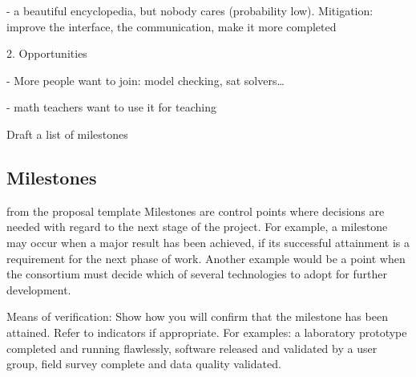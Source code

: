 - a beautiful encyclopedia, but nobody cares (probability low). Mitigation: improve the interface, the communication, make it more completed

2.  Opportunities

- More people want to join: model checking, sat solvers… 

- math teachers want to use it for teaching


{\color{red} Draft a list of milestones}

\subsection{Milestones}\label{sec:milestones}

\begin{todo}{from the proposal template}
  Milestones are control points where decisions are needed with regard to the next stage
  of the project. For example, a milestone may occur when a major result has been
  achieved, if its successful attainment is a requirement for the next phase of
  work. Another example would be a point when the consortium must decide which of several
  technologies to adopt for further development.

  Means of verification: Show how you will confirm that the milestone has been
  attained. Refer to indicators if appropriate. For examples: a laboratory prototype
  completed and running flawlessly, software released and validated by a user group, field
  survey complete and data quality validated.
\end{todo}




